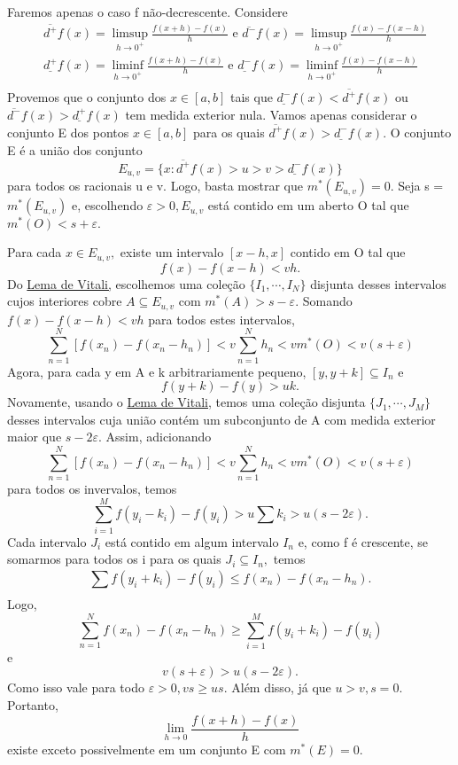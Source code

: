 \documentclass[Analysis/analysis_notes.tex]{subfiles}
\begin{document}
\begin{proof*}
	Faremos apenas o caso f não-decrescente. Considere
	\begin{align*}
		 & \overline{d^{+}}f(x) = \limsup_{h\to 0^{+}} \frac{f(x+h)-f(x)}{h}\text{ e }\overline{d^{-}}f(x) = \limsup_{h\to 0^{+}}\frac{f(x) - f(x-h)}{h}   \\
		 & \underline{d^{+}}f(x) = \liminf_{h\to 0^{+}} \frac{f(x+h)-f(x)}{h}\text{ e }\underline{d^{-}}f(x) = \liminf_{h\to 0^{+}}\frac{f(x) - f(x-h)}{h} \\
	\end{align*}
	Provemos que o conjunto dos \(x\in[a, b]\) tais que \(\underline{d^{-}}f(x) < \overline{d^{+}}f(x)\)
	ou \(\overline{d^{-}}f(x) > \underline{d^{+}}f(x)\) tem medida exterior nula.
	Vamos apenas considerar o conjunto E dos pontos \(x\in[a, b]\) para os quais
	\(\overline{d^{+}}f(x) > \underline{d^{-}}f(x).\) O conjunto E é a união
	dos conjunto
	\[
		E_{u, v} = \{x: \overline{d^{+}}f(x) > u > v > \underline{d^{-}}f(x) \}
	\]
	para todos os racionais u e v. Logo, basta mostrar que \(m^{*}(E_{u, v}) = 0.\)
	Seja s = \(m^{*}(E_{u,v })\) e, escolhendo \(\varepsilon >0, E_{u, v}\) está contido
	em um aberto O tal que \(m^{*}(O) < s + \varepsilon .\)

	Para cada \(x\in E_{u, v},\) existe um intervalo \([x-h, x]\) contido em O tal que
	\[
		f(x) - f(x-h) < vh.
	\]
	Do \hyperlink{vitali_covering}{Lema de Vitali,} escolhemos uma cole\c cão \(\{I_{1}, \cdots, I_{N}\} \)
	disjunta desses intervalos cujos interiores cobre \(A\subseteq{E_{u, v}}\) com
	\(m^{*}(A) > s-\varepsilon .\) Somando \(f(x) - f(x-h) < vh\) para todos estes intervalos,
	\[
		\sum\limits_{n=1}^{N}[f(x_{n}) - f(x_{n}-h_{n})] < v \sum\limits_{n=1}^{N}h_{n} < vm^{*}(O) < v(s+\varepsilon )
	\]
	Agora, para cada y em A e k arbitrariamente pequeno, \([y, y+k]\subseteq{I_{n}}\) e
	\[
		f(y+k)-f(y) > uk.
	\]
	Novamente, usando o \hyperlink{vitali_covering}{Lema de Vitali,} temos uma cole\c cão
	disjunta \(\{J_{1}, \cdots, J_{M}\}\) desses intervalos cuja união contém um
	subconjunto de A com medida exterior maior que \(s-2\varepsilon .\) Assim,
	adicionando
	\[
		\sum\limits_{n=1}^{N}[f(x_{n}) - f(x_{n}-h_{n})] < v \sum\limits_{n=1}^{N}h_{n} < vm^{*}(O) < v(s+\varepsilon )
	\]
	para todos os invervalos, temos
	\[
		\sum\limits_{i=1}^{M}f(y_{i}-k_{i})-f(y_{i}) > u\sum k_{i} > u (s-2\varepsilon ).
	\]
	Cada intervalo \(J_{i}\) está contido em algum intervalo \(I_{n}\) e, como f é
	crescente, se somarmos para todos os i para os quais \(J_{i}\subseteq{I_{n}},\) temos
	\[
		\sum\limits_{}^{}f(y_{i}+k_{i}) - f(y_{i})\leq f(x_{n}) - f(x_{n}-h_{n}).
	\]
	Logo,
	\[
		\sum\limits_{n=1}^{N}f(x_{n})-f(x_{n}-h_{n})\geq \sum\limits_{i=1}^{M}f(y_{i}+k_{i}) - f(y_{i})
	\]
	e
	\[
		v(s+\varepsilon ) > u(s-2\varepsilon ).
	\]
	Como isso vale para todo \(\varepsilon >0, vs\geq us.\) Além disso, já que
	\(u > v, s=0.\) Portanto,
	\[
		\lim_{h\to 0}\frac{f(x+h)-f(x)}{h}
	\]
	existe exceto possivelmente em um conjunto E com \(m^{*}(E) = 0.\) \qedsymbol
\end{proof*}
\end{document}
